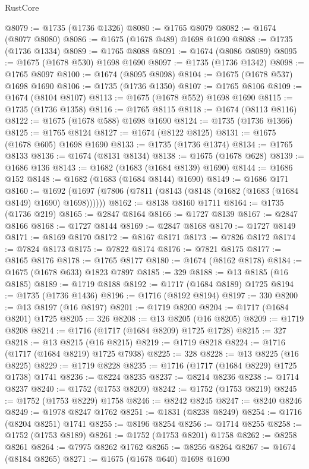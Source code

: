 \begin{lexlean}{RustCore}
\begin{coremodule}
@8079 := @1735 (@1736 @1326)
@8080 := @1765 @8079
@8082 := @1674 (@8077 @8080)
@8086 := @1675 (@1678 @489) @1698 @1690
@8088 := @1735 (@1736 @1334)
@8089 := @1765 @8088
@8091 := @1674 (@8086 @8089)
@8095 := @1675 (@1678 @530) @1698 @1690
@8097 := @1735 (@1736 @1342)
@8098 := @1765 @8097
@8100 := @1674 (@8095 @8098)
@8104 := @1675 (@1678 @537) @1698 @1690
@8106 := @1735 (@1736 @1350)
@8107 := @1765 @8106
@8109 := @1674 (@8104 @8107)
@8113 := @1675 (@1678 @552) @1698 @1690
@8115 := @1735 (@1736 @1358)
@8116 := @1765 @8115
@8118 := @1674 (@8113 @8116)
@8122 := @1675 (@1678 @588) @1698 @1690
@8124 := @1735 (@1736 @1366)
@8125 := @1765 @8124
@8127 := @1674 (@8122 @8125)
@8131 := @1675 (@1678 @605) @1698 @1690
@8133 := @1735 (@1736 @1374)
@8134 := @1765 @8133
@8136 := @1674 (@8131 @8134)
@8138 := @1675 (@1678 @628)
@8139 := @1686 @136
@8143 := @1682 (@1683 (@1684 @8139) @1690)
@8144 := @1686 @152
@8148 := @1682 (@1683 (@1684 @8144) @1690)
@8149 := @1686 @171
@8160 := @1692 (@1697 (@7806 (@7811 (@8143 (@8148 (@1682 (@1683 (@1684 @8149) @1690) @1698))))))
@8162 := @8138 @8160 @1711
@8164 := @1735 (@1736 @219)
@8165 := @2847 @8164
@8166 := @1727 @8139
@8167 := @2847 @8166
@8168 := @1727 @8144
@8169 := @2847 @8168
@8170 := @1727 @8149
@8171 := @8169 @8170
@8172 := @8167 @8171
@8173 := @7826 @8172
@8174 := @7824 @8173
@8175 := @7822 @8174
@8176 := @7821 @8175
@8177 := @8165 @8176
@8178 := @1765 @8177
@8180 := @1674 (@8162 @8178)
@8184 := @1675 (@1678 @633) @1823 @7897
@8185 := 329
@8188 := @13 @8185 (@16 @8185)
@8189 := @1719 @8188
@8192 := @1717 (@1684 @8189) @1725
@8194 := @1735 (@1736 @1436)
@8196 := @1716 (@8192 @8194)
@8197 := 330
@8200 := @13 @8197 (@16 @8197)
@8201 := @1719 @8200
@8204 := @1717 (@1684 @8201) @1725
@8205 := 326
@8208 := @13 @8205 (@16 @8205)
@8209 := @1719 @8208
@8214 := @1716 (@1717 (@1684 @8209) @1725 @1728)
@8215 := 327
@8218 := @13 @8215 (@16 @8215)
@8219 := @1719 @8218
@8224 := @1716 (@1717 (@1684 @8219) @1725 @7938)
@8225 := 328
@8228 := @13 @8225 (@16 @8225)
@8229 := @1719 @8228
@8235 := @1716 (@1717 (@1684 @8229) @1725 @1738) @1741
@8236 := @8224 @8235
@8237 := @8214 @8236
@8238 := @1714 @8237
@8240 := @1752 (@1753 @8209)
@8242 := @1752 (@1753 @8219)
@8245 := @1752 (@1753 @8229) @1758
@8246 := @8242 @8245
@8247 := @8240 @8246
@8249 := @1978 @8247 @1762
@8251 := @1831 (@8238 @8249)
@8254 := @1716 (@8204 @8251) @1741
@8255 := @8196 @8254
@8256 := @1714 @8255
@8258 := @1752 (@1753 @8189)
@8261 := @1752 (@1753 @8201) @1758
@8262 := @8258 @8261
@8264 := @7975 @8262 @1762
@8265 := @8256 @8264
@8267 := @1674 (@8184 @8265)
@8271 := @1675 (@1678 @640) @1698 @1690

\end{coremodule}
\end{lexlean}
